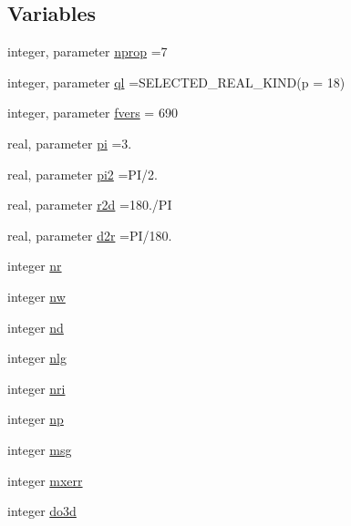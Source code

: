\subsection*{Variables}
\begin{DoxyCompactItemize}
\item 
integer, parameter \hyperlink{namespacelg__input__routines_a359e88d4557350cba3a221e513b5a0fa}{nprop} =7
\item 
integer, parameter \hyperlink{namespacelg__input__routines_a8c3fd17aa03dd450ed3e242df939ad01}{ql} =S\+E\+L\+E\+C\+T\+E\+D\+\_\+\+R\+E\+A\+L\+\_\+\+K\+I\+ND(p = 18)
\item 
integer, parameter \hyperlink{namespacelg__input__routines_ad64edbbe93c0335e2a4d4d767eb9bbd1}{fvers} = 690
\item 
real, parameter \hyperlink{namespacelg__input__routines_a7464991af66db8354411ef5f57a78a71}{pi} =3.
\item 
real, parameter \hyperlink{namespacelg__input__routines_a6274a2779db9ccb43e23b33ea759ed09}{pi2} =PI/2.
\item 
real, parameter \hyperlink{namespacelg__input__routines_a25c56d53596a755b2c9f8bc95595bdde}{r2d} =180./PI
\item 
real, parameter \hyperlink{namespacelg__input__routines_a17c7af951ca7d0cf40e35d63cadf6d43}{d2r} =PI/180.
\item 
integer \hyperlink{namespacelg__input__routines_abad63a3f02d5381de7890e436e450ca6}{nr}
\item 
integer \hyperlink{namespacelg__input__routines_a1184bd0c1a23b793999aa5ae8df45410}{nw}
\item 
integer \hyperlink{namespacelg__input__routines_aad696affac93d988d4b792cdfaccf874}{nd}
\item 
integer \hyperlink{namespacelg__input__routines_a2b185a6190d1157ccb7596a980ddeee2}{nlg}
\item 
integer \hyperlink{namespacelg__input__routines_a1d104fe3ddbda17fb2f63b3d483143f8}{nri}
\item 
integer \hyperlink{namespacelg__input__routines_a1f4753d84cde284fc19867e152298c89}{np}
\item 
integer \hyperlink{namespacelg__input__routines_a8156420c85f94edf75fe7cc28ec9c826}{msg}
\item 
integer \hyperlink{namespacelg__input__routines_abe4359e93c3a6a113806a9c696d6ecfd}{mxerr}
\item 
integer \hyperlink{namespacelg__input__routines_af78f7591d1f55c4a9a6aec78bdafb61c}{do3d}
\item 

\end{DoxyCompactItemize}
